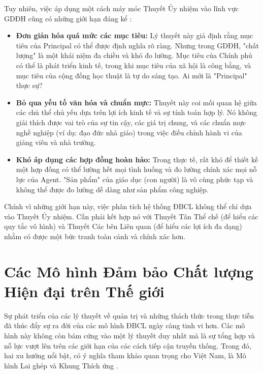 \documentclass[12pt, a4paper, openany]{report}
\begin{document}
Tuy nhiên, việc áp dụng một cách máy móc Thuyết Ủy nhiệm vào lĩnh vực GDĐH cũng có những giới hạn đáng kể \cite{RIHE2022}:
\begin{itemize}
    \item \textbf{Đơn giản hóa quá mức các mục tiêu:} Lý thuyết này giả định rằng mục tiêu của Principal có thể được định nghĩa rõ ràng. Nhưng trong GDĐH, "chất lượng" là một khái niệm đa chiều và khó đo lường. Mục tiêu của Chính phủ có thể là phát triển kinh tế, trong khi mục tiêu của xã hội là công bằng, và mục tiêu của cộng đồng học thuật là tự do sáng tạo. Ai mới là "Principal" thực sự?
    \item \textbf{Bỏ qua yếu tố văn hóa và chuẩn mực:} Thuyết này coi mối quan hệ giữa các chủ thể chủ yếu dựa trên lợi ích kinh tế và sự tính toán hợp lý. Nó không giải thích được vai trò của sự tin cậy, các giá trị chung, và các chuẩn mực nghề nghiệp (ví dụ: đạo đức nhà giáo) trong việc điều chỉnh hành vi của giảng viên và nhà trường.
    \item \textbf{Khó áp dụng các hợp đồng hoàn hảo:} Trong thực tế, rất khó để thiết kế một hợp đồng có thể lường hết mọi tình huống và đo lường chính xác mọi nỗ lực của Agent. "Sản phẩm" của giáo dục (con người) là vô cùng phức tạp và không thể được đo lường dễ dàng như sản phẩm công nghiệp.
\end{itemize}
Chính vì những giới hạn này, việc phân tích hệ thống ĐBCL không thể chỉ dựa vào Thuyết Ủy nhiệm. Cần phải kết hợp nó với Thuyết Tân Thể chế (để hiểu các quy tắc vô hình) và Thuyết Các bên Liên quan (để hiểu các lợi ích đa dạng) nhằm có được một bức tranh toàn cảnh và chính xác hơn.

\section{Các Mô hình Đảm bảo Chất lượng Hiện đại trên Thế giới}
\label{sec:mo_hinh_hien_dai_the_gioi}

Sự phát triển của các lý thuyết về quản trị và những thách thức trong thực tiễn đã thúc đẩy sự ra đời của các mô hình ĐBCL ngày càng tinh vi hơn. Các mô hình này không còn bám cứng vào một lý thuyết duy nhất mà là sự tổng hợp và nỗ lực vượt lên trên các giới hạn của các cách tiếp cận truyền thống. Trong đó, hai xu hướng nổi bật, có ý nghĩa tham khảo quan trọng cho Việt Nam, là Mô hình Lai ghép và Khung Thích ứng \cite{HybridModel2023, AdaptiveQA2022}.
\end{document}
